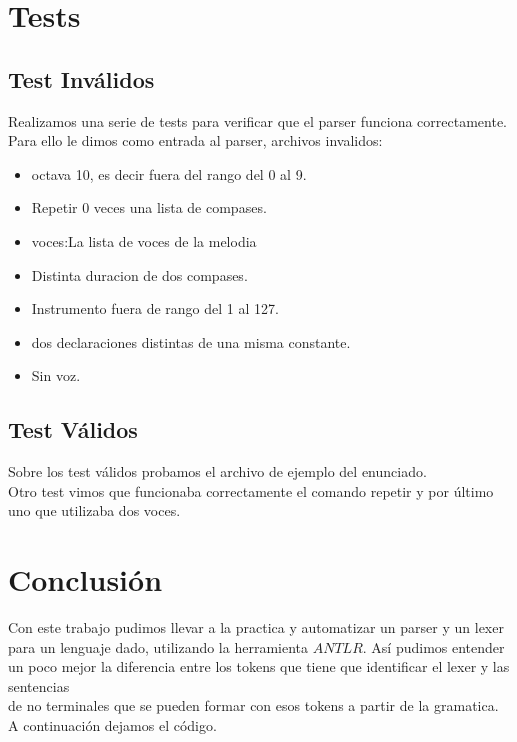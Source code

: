 \documentclass[a4paper]{article}
\begin{document}
\section{Tests}
\subsection{Test Inválidos}

Realizamos una serie de tests para verificar que el parser funciona correctamente. Para ello le dimos como entrada al parser, archivos invalidos:

\begin{itemize}

\item octava 10, es decir fuera del rango del 0 al 9.
\item Repetir 0 veces una lista de compases.
\item voces:La lista de voces de la melodia
\item Distinta duracion de dos compases.
\item Instrumento fuera de rango del 1 al 127.
\item dos declaraciones distintas de una misma constante.
\item Sin voz.

\end{itemize}

\subsection{Test Válidos}

Sobre los test válidos probamos el archivo de ejemplo del enunciado.\\
Otro test vimos que funcionaba correctamente el comando repetir y por último uno que utilizaba dos voces.

\section{Conclusión}
Con este trabajo pudimos llevar a la practica y automatizar un parser y un lexer para un lenguaje dado, utilizando la herramienta $ANTLR$.
Así pudimos entender un poco mejor la diferencia entre los tokens que tiene que identificar el lexer y las sentencias\\
de no terminales que se
pueden formar con esos tokens a partir de la gramatica.
A continuación dejamos el código.


\end{document}
